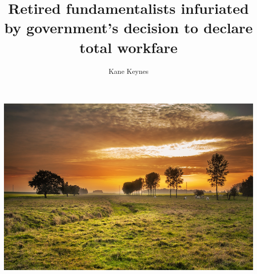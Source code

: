 \documentclass{bonaparticle}
\title {Retired fundamentalists infuriated by government's decision to declare total workfare}
\author{Kane Keynes}
\begin{document}
    \maketitle
    
    \begin{multicols}{2}
        \begin{lead}
            \lipsum[1]
        \end{lead}

        \lipsum[2]
        
        \includegraphics[width=\columnwidth]{landscape}
        
        \lipsum[3-6]
    \end{multicols}
\end{document}

